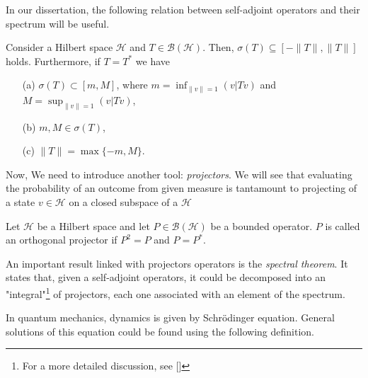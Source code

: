  In our dissertation, the following relation between self-adjoint operators and their spectrum will be useful.
 \begin{prop}
 	Consider a Hilbert space $\mathcal{H}$ and $T\in\mathcal{B}(\mathcal{H})$. Then, $\sigma(T)\subseteq[-\|T\|,\|T\|]$ holds. Furthermore, if $T=T^*$ we have
 	\begin{itemize}
 		\item[(a)]$\sigma(T)\subset[m,M]$, where $m=\inf_{\|v\|=1}(v|Tv)$ and $M=\sup_{\|v\|=1}(v|Tv)$,
 		\item[(b)] $m,M\in\sigma(T)$,
 		\item[(c)] $\|T\|=\max\{-m,M\}$.
 	\end{itemize}
 \end{prop}
 
 
Now, We need to introduce another tool: \textit{projectors}. We will see that evaluating the probability of an outcome from given measure is tantamount to projecting of a state $v\in\mathcal{H}$ on a closed subspace of a $\mathcal{H}$

 \begin{definition}
 	\label{def:projector}
 	Let $\mathcal{H}$ be a Hilbert space and let $P\in\mathcal{B}(\mathcal{H})$ be a bounded operator. $P$ is called an orthogonal projector if $P^2=P$ and $P=P^*$.
 \end{definition}
 
 
 \begin{oss}
 An important result linked with projectors operators is the \textit{spectral theorem}. It states that, given a self-adjoint operators, it could be decomposed into an "integral"\footnote{For a more detailed discussion, see [\citealp[Chap. 8]{more}]} of projectors, each one  associated with an element of the spectrum.
 \end{oss}
 
 
 In quantum mechanics, dynamics is given by Schr\"{o}dinger equation. General solutions of this equation could be found using the following definition.
 
